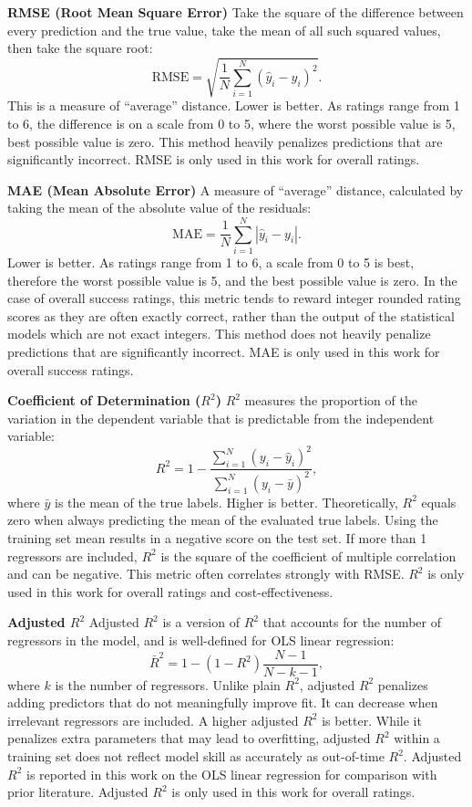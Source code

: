 \documentclass[12pt,a4paper]{article}
\begin{document}
\textbf{RMSE (Root Mean Square Error)}
Take the square of the difference between every prediction and the true value, take the mean of all such squared values, then take the square root:
\[
  \mathrm{RMSE} = \sqrt{\frac{1}{N}\sum_{i=1}^{N}(\hat{y}_i - y_i)^2}.
\]
This is a measure of ``average'' distance. Lower is better. As ratings range from 1 to 6, the difference is on a scale from 0 to 5, where the worst possible value is 5, best possible value is zero. This method heavily penalizes predictions that are significantly incorrect. RMSE is only used in this work for overall ratings.

\textbf{MAE (Mean Absolute Error)}
A measure of ``average'' distance, calculated by taking the mean of the absolute value of the residuals:
\[
  \mathrm{MAE} = \frac{1}{N}\sum_{i=1}^{N}|\hat{y}_i - y_i|.
\]
Lower is better. As ratings range from 1 to 6, a scale from 0 to 5 is best, therefore the worst possible value is 5, and the best possible value is zero. In the case of overall success ratings, this metric tends to reward integer rounded rating scores as they are often exactly correct, rather than the output of the statistical models which are not exact integers. This method does not heavily penalize predictions that are significantly incorrect. MAE is only used in this work for overall success ratings.

\textbf{Coefficient of Determination ($R^2$)}
$R^2$ measures the proportion of the variation in the dependent variable that is predictable from the independent variable:
\[
  R^2 = 1 - \frac{\sum_{i=1}^{N}(y_i - \hat{y}_i)^2}{\sum_{i=1}^{N}(y_i - \bar{y})^2},
\]
where $\bar{y}$ is the mean of the true labels. Higher is better. Theoretically, $R^2$ equals zero when always predicting the mean of the evaluated true labels. Using the training set mean results in a negative score on the test set. If more than 1 regressors are included, $R^2$ is the square of the coefficient of multiple correlation and can be negative. This metric often correlates strongly with RMSE. $R^2$ is only used in this work for overall ratings and cost-effectiveness.

\textbf{Adjusted $R^2$}
Adjusted $R^2$ is a version of $R^2$ that accounts for the number of regressors in the model, and is well-defined for OLS linear regression:
\[
  \bar{R}^2 = 1 - (1 - R^2)\frac{N-1}{N-k-1},
\]
where $k$ is the number of regressors. Unlike plain $R^2$, adjusted $R^2$ penalizes adding predictors that do not meaningfully improve fit. It can decrease when irrelevant regressors are included. A higher adjusted $R^2$ is better. While it penalizes extra parameters that may lead to overfitting, adjusted $R^2$ within a training set does not reflect model skill as accurately as out-of-time $R^2$. Adjusted $R^2$ is reported in this work on the OLS linear regression for comparison with prior literature. Adjusted $R^2$ is only used in this work for overall ratings.
\end{document}
